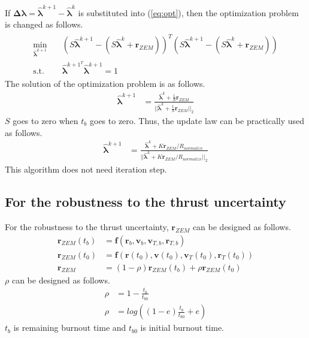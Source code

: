 \documentclass{fdclreport}
\begin{document}
If $\bm{\Delta \lambda} = \bm{\hat{\lambda}}^{k+1} - \bm{\hat{\lambda}}^{k}$ is substituted into (\ref{eq:opt}), then the optimization problem is changed as follows.
\begin{align}
	\begin{split}
	\min_{\bm{\hat\lambda}^{k+1}} \quad & \left( S \bm{\hat{\lambda}}^{k+1} - (S \bm{\hat{\lambda}}^{k} + \bm{r}_{ZEM}) \right)^T \left( S \bm{\hat{\lambda}}^{k+1} - (S \bm{\hat{\lambda}}^{k} + \bm{r}_{ZEM}) \right) \\
	\textrm{s.t.} \quad & \bm{\hat{\lambda}}^{{k+1}^T} \bm{\hat{\lambda}}^{k+1} = 1 \label{eq:opt2}
\end{split}
\end{align}
The solution of the optimization problem is as follows.
\begin{align}
	\bm{\hat{\lambda}}^{k+1} &= \frac{\bm{\hat{\lambda}}^k + \frac{1}{S} \bm{r}_{ZEM}}{||\bm{\hat{\lambda}}^k + \frac{1}{S} \bm{r}_{ZEM}||_2}
\end{align}
$S$ goes to zero when $t_b$ goes to zero. Thus, the update law can be practically used as follows.
\begin{align}
	\bm{\hat{\lambda}}^{k+1} &= \frac{\bm{\hat{\lambda}}^{k} + K \bm{r}_{ZEM}/R_{normalize}}{||\bm{\hat{\lambda}}^{k} + K \bm{r}_{ZEM}/R_{normalize}||_2}
\end{align}
This algorithm does not need iteration step.

\subsection{For the robustness to the thrust uncertainty}
For the robustness to the thrust uncertainty, $\bm{r}_{ZEM}$ can be designed as follows.
\begin{align}
	\bm{r}_{ZEM}(t_b) &= \bm{f}(\bm{r}_b, \bm{v}_b, \bm{v}_{T,b}, \bm{r}_{T,b}) \\
	\bm{r}_{ZEM}(t_0) &= \bm{f}(\bm{r}(t_0), \bm{v}(t_0), \bm{v}_T(t_0), \bm{r}_T(t_0)) \\
	\bm{r}_{ZEM} &= (1-\rho) \bm{r}_{ZEM}(t_b) + \rho \bm{r}_{ZEM}(t_0) 
\end{align}
$\rho$ can be designed as follows.
\begin{align}
	\rho &= 1 - \frac{t_b}{t_{b0}} \\
	\rho &= log \left( (1-e)\frac{t_b}{t_{b0}} + e \right)
\end{align}
$t_b$ is remaining burnout time and $t_{b0}$ is initial burnout time.
\end{document}
